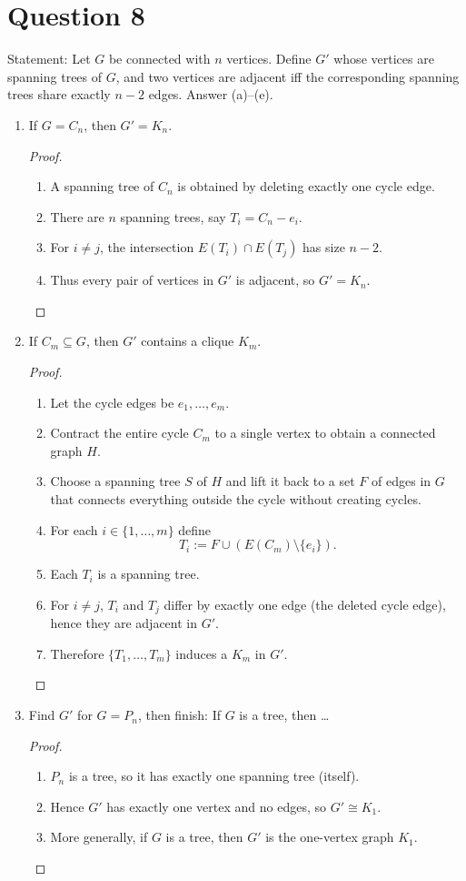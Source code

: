 \documentclass[11pt]{article}
\begin{document}
\newpage

\section*{Question 8}
Statement: Let $G$ be connected with $n$ vertices. Define $G'$ whose vertices are spanning trees of $G$, and two vertices are adjacent iff the corresponding spanning trees share exactly $n-2$ edges. Answer (a)--(e).

\begin{enumerate}
\item[(a)] If $G=C_n$, then $G'=K_n$.
\begin{proof}
~
\begin{enumerate}
\item A spanning tree of $C_n$ is obtained by deleting exactly one cycle edge.
\item There are $n$ spanning trees, say $T_i=C_n-e_i$.
\item For $i\neq j$, the intersection $E(T_i)\cap E(T_j)$ has size $n-2$.
\item Thus every pair of vertices in $G'$ is adjacent, so $G'=K_n$.
\end{enumerate}
\end{proof}

\item[(b)] If $C_m\subseteq G$, then $G'$ contains a clique $K_m$.
\begin{proof}
~
\begin{enumerate}
\item Let the cycle edges be $e_1,\dots,e_m$.
\item Contract the entire cycle $C_m$ to a single vertex to obtain a connected graph $H$.
\item Choose a spanning tree $S$ of $H$ and lift it back to a set $F$ of edges in $G$ that connects everything outside the cycle without creating cycles.
\item For each $i\in\{1,\dots,m\}$ define
\[
T_i := F \cup (E(C_m)\setminus\{e_i\}).
\]
\item Each $T_i$ is a spanning tree.
\item For $i\neq j$, $T_i$ and $T_j$ differ by exactly one edge (the deleted cycle edge), hence they are adjacent in $G'$.
\item Therefore $\{T_1,\dots,T_m\}$ induces a $K_m$ in $G'$.
\end{enumerate}
\end{proof}

\item[(c)] Find $G'$ for $G=P_n$, then finish: If $G$ is a tree, then \dots
\begin{proof}
~
\begin{enumerate}
\item $P_n$ is a tree, so it has exactly one spanning tree (itself).
\item Hence $G'$ has exactly one vertex and no edges, so $G'\cong K_1$.
\item More generally, if $G$ is a tree, then $G'$ is the one-vertex graph $K_1$.
\end{enumerate}
\end{proof}


\end{enumerate}
\end{document}
